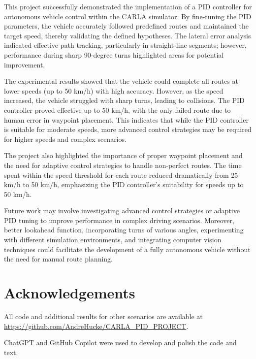 \documentclass[conference]{IEEEtran}
\begin{document}
This project successfully demonstrated the implementation of a PID controller for autonomous vehicle control within the CARLA simulator. By fine-tuning the PID parameters, the vehicle accurately followed predefined routes and maintained the target speed, thereby validating the defined hypotheses. The lateral error analysis indicated effective path tracking, particularly in straight-line segments; however, performance during sharp 90-degree turns highlighted areas for potential improvement.

The experimental results showed that the vehicle could complete all routes at lower speeds (up to 50 km/h) with high accuracy. However, as the speed increased, the vehicle struggled with sharp turns, leading to collisions. The PID controller proved effective up to 50 km/h, with the only failed route due to human error in waypoint placement. This indicates that while the PID controller is suitable for moderate speeds, more advanced control strategies may be required for higher speeds and complex scenarios.

The project also highlighted the importance of proper waypoint placement and the need for adaptive control strategies to handle non-perfect routes. The time spent within the speed threshold for each route reduced dramatically from 25 km/h to 50 km/h, emphasizing the PID controller's suitability for speeds up to 50 km/h.

Future work may involve investigating advanced control strategies or adaptive PID tuning to improve performance in complex driving scenarios. Moreover, better lookahead function, incorporating turns of various angles, experimenting with different simulation environments, and integrating computer vision techniques could facilitate the development of a fully autonomous vehicle without the need for manual route planning.

\section{Acknowledgements}

All code and additional results for other scenarios are available at \url{https://github.com/AndreHucke/CARLA_PID_PROJECT}.

ChatGPT and GitHub Copilot were used to develop and polish the code and text.



\end{document}
